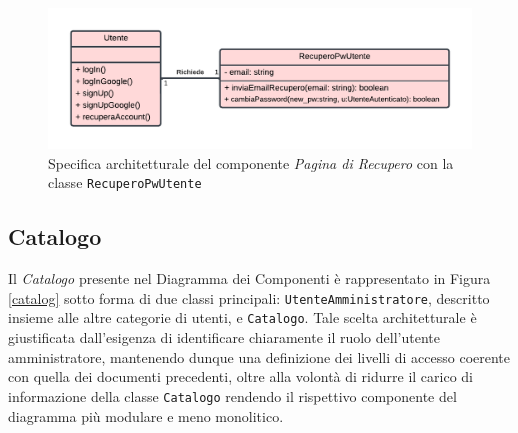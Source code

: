 \documentclass[11pt, a4paper]{article}
\theoremstyle{definition} %
\begin{document}
\begin{figure}[H]
\centering
\hspace*{-1cm}
\includegraphics[scale = 0.8]{materiale/class-recupero.pdf}
\caption{Specifica architetturale del componente \textit{Pagina di Recupero} con la classe \texttt{RecuperoPwUtente}}
\label{recupero}
\end{figure}



\newpage
\subsection{Catalogo}
Il \textit{Catalogo} presente nel Diagramma dei Componenti è rappresentato in
Figura \ref{catalog} sotto forma di due classi principali: \texttt{UtenteAmministratore}, descritto insieme
alle altre categorie di utenti, e \texttt{Catalogo}. Tale scelta architetturale
è giustificata dall'esigenza di identificare chiaramente il ruolo dell'utente
amministratore, mantenendo dunque una definizione dei livelli di accesso
coerente con quella dei documenti precedenti, oltre alla volontà di ridurre il
carico di informazione della classe \texttt{Catalogo} rendendo il rispettivo
componente del diagramma più modulare e meno monolitico.
\end{document}
